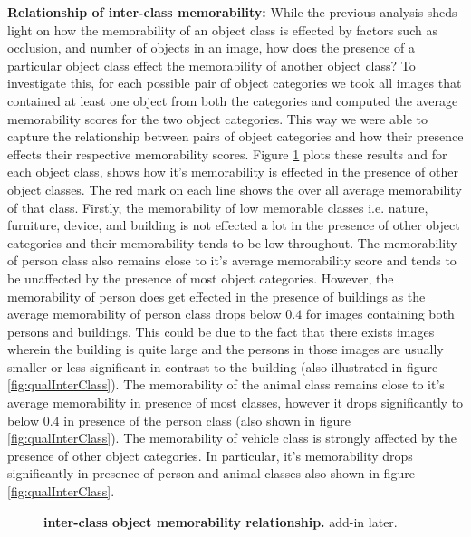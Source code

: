 \textbf{Relationship of inter-class memorability:} While the previous analysis sheds light on how the memorability of an object class is effected by factors such as occlusion, and number of objects in an image, how does the presence of a particular object class effect the memorability of another object class? To investigate this, for each possible pair of object categories we took all images that contained at least one object from both the categories and computed the average memorability scores for the two object categories. This way we were able to capture the relationship between pairs of object categories and how their presence effects their respective memorability scores. Figure \ref{fig:obLabelPair} plots these results and for each object class, shows how it's memorability is effected in the presence of other object classes. The red mark on each line shows the over all average memorability of that class. Firstly, the memorability of low memorable classes i.e. nature, furniture, device, and building is not effected a lot in the presence of other object categories and their memorability tends to be low throughout. The memorability of person class also remains close to it's average memorability score and tends to be unaffected by the presence of most object categories. However, the memorability of person does get effected in the presence of buildings as the average memorability of person class drops below $0.4$ for images containing both persons and buildings. This could be due to the fact that there exists images wherein the building is quite large and the persons in those images are usually smaller or less significant in contrast to the building (also illustrated in figure \ref{fig:qualInterClass}). The memorability of the animal class remains close to it's average memorability in presence of most classes, however it drops significantly to below $0.4$ in presence of the person class (also shown in figure \ref{fig:qualInterClass}). The memorability of vehicle class is strongly affected by the presence of other object categories. In particular, it's memorability drops significantly in presence of person and animal classes also shown in figure \ref{fig:qualInterClass}.

\begin{figure}[h]
\centering
{}
\vspace{-5mm}\caption{\footnotesize\textbf{inter-class object memorability relationship.} add-in later. }\label{fig:obLabelPair}
\end{figure}

